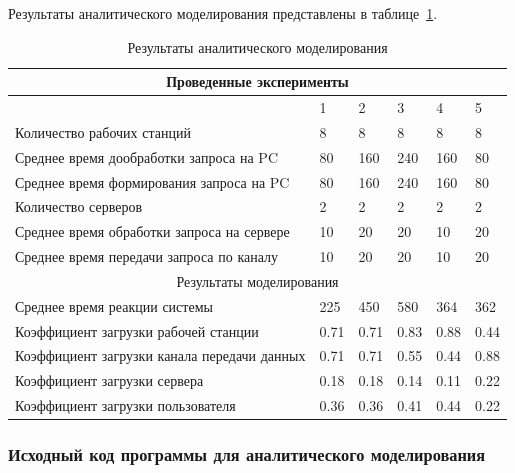 \documentclass[russian,utf8,emptystyle]{eskdtext}
\begin{document}
Результаты аналитического моделирования представлены в таблице~\ref{tab:anal-result}.

\begin{longtable}{p{10cm}|p{1cm}|p{1cm}|p{1cm}|p{1cm}|p{1cm}}
\caption{Результаты аналитического моделирования}
\label{tab:anal-result} \\
\hline
\multicolumn{6}{c}{Проведенные эксперименты} \\ \hline
                                                    & 1      & 2      & 3      & 4      & 5       \\ \cline{2-6}
Количество рабочих станций                          & 8      & 8      & 8      & 8      & 8      \\
Среднее время дообработки запроса на PC             & 80     & 160    & 240    & 160    & 80     \\
Среднее время формирования запроса на PC            & 80     & 160    & 240    & 160    & 80     \\
Количество серверов                                 & 2      & 2      & 2      & 2      & 2      \\
Среднее время обработки запроса на сервере          & 10     & 20     & 20     & 10     & 20     \\
Среднее время передачи запроса по каналу            & 10     & 20     & 20     & 10     & 20     \\  
\hline
\multicolumn{6}{c}{Результаты моделирования} \\ 
\hline
Среднее время реакции системы                       & 225    & 450    & 580    & 364    & 362    \\
Коэффициент загрузки рабочей станции                & 0.71   & 0.71   & 0.83   & 0.88   & 0.44   \\
Коэффициент загрузки канала передачи данных         & 0.71   & 0.71   & 0.55   & 0.44   & 0.88   \\
Коэффициент загрузки сервера                        & 0.18   & 0.18   & 0.14   & 0.11   & 0.22   \\
Коэффициент загрузки пользователя                   & 0.36   & 0.36   & 0.41   & 0.44   & 0.22   \\
\end{longtable}

\subsubsection{Исходный код программы для аналитического моделирования}
\end{document}
